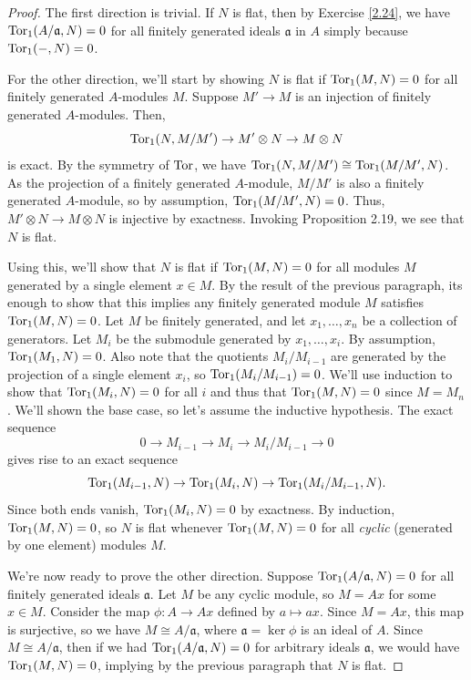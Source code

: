 \begin{proof}
The first direction is trivial. If $N$ is flat, then by Exercise \ref{2.24}, we have $\operatorname{Tor}_1(A/\mathfrak{a}, N) = 0$ for all finitely generated ideals $\mathfrak{a}$ in $A$
simply because $\operatorname{Tor}_1(-,N) = 0$.

For the other direction, we'll start by showing $N$ is flat if $\operatorname{Tor}_1(M,N) = 0$ for all finitely generated $A$-modules $M$. Suppose $M' \to M$ is an injection of finitely generated 
$A$-modules. Then,
$$\operatorname{Tor}_1(N, M/M') \to M' \otimes N \to M \otimes N$$
is exact. By the symmetry of $\operatorname{Tor}$, we have $\operatorname{Tor}_1(N,M/M') \cong \operatorname{Tor}_1(M/M',N)$. As the projection of a finitely generated $A$-module, $M/M'$ is also a finitely generated $A$-module,
so by assumption, $\operatorname{Tor}_1(M/M',N) = 0$. Thus, $M' \otimes N \to M \otimes N$ is injective
by exactness. Invoking Proposition 2.19, we see that $N$ is flat.

Using this, we'll show that $N$ is flat if $\operatorname{Tor}_1(M,N) = 0$ for all modules $M$ generated by a single element $x \in M$. By the result of the previous paragraph, its enough to show that this implies
any finitely generated module $M$ satisfies $\operatorname{Tor}_1(M,N) = 0$. Let $M$ be finitely generated, and let $x_1,\ldots,x_n$ be a collection of generators. Let $M_i$ be the submodule generated by $x_1,\ldots,x_i$. 
By assumption, $\operatorname{Tor}_1(M_1,N) = 0$. Also note that the quotients $M_i/M_{i-1}$ are generated by the projection of a single element $x_i$, so $\operatorname{Tor}_1(M_i/M_{i-1}) = 0$. We'll use induction
to show that $\operatorname{Tor}_1(M_i,N) = 0$ for all $i$ and thus that $\operatorname{Tor}_1(M,N) = 0$ since $M = M_n$. We'll shown the base case, so let's assume the inductive hypothesis. The exact sequence
$$0 \to M_{i-1} \to M_i \to M_i/M_{i-1} \to 0$$
gives rise to an exact sequence
$$\operatorname{Tor}_1(M_{i-1},N) \to \operatorname{Tor}_1(M_i,N) \to \operatorname{Tor}_1(M_i/M_{i-1},N).$$
Since both ends vanish, $\operatorname{Tor}_1(M_i,N) = 0$ by exactness. By induction, $\operatorname{Tor}_1(M,N) = 0$, so $N$ is flat whenever $\operatorname{Tor}_1(M,N) = 0$ for all {\it cyclic} (generated by one element) modules $M$.

We're now ready to prove the other direction. Suppose $\operatorname{Tor}_1(A/\mathfrak{a},N) = 0$ for all finitely generated ideals $\mathfrak{a}$. Let $M$ be any cyclic module, so $M = Ax$ for some $x \in M$.
Consider the map $\phi : A \to Ax$ defined by $a \mapsto ax$. Since $M = Ax$, this map is surjective, so we have $M \cong A/\mathfrak{a}$, where $\mathfrak{a} = \ker\phi$ is an ideal of $A$. 
Since $M \cong A/\mathfrak{a}$, then if we had $\operatorname{Tor}_1(A/\mathfrak{a},N) = 0$ for arbitrary ideals $\mathfrak{a}$, we would have $\operatorname{Tor}_1(M,N) = 0$, implying by the previous paragraph that $N$ is flat.


\end{proof}
